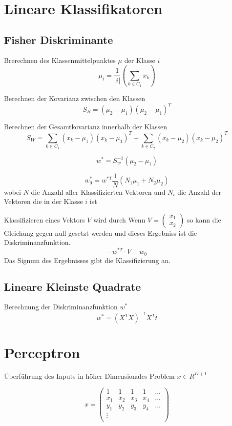 \documentclass{article}
\begin{document}
\section{Lineare Klassifikatoren}

\subsection{Fisher Diskriminante}

Brerechnen des Klassenmittelpunktes $\mu$ der Klasse $i$
$$\mu_i = \frac{1}{|i|} (\sum_{k \in C_1}^{} x_k)$$

Berechnen der Kovarianz zwischen den Klassen 
$$
S_{B} = (\mu_{2} - \mu_{1})(\mu_{2} - \mu_{1})^T
$$

Berechnen der Gesamtkovarianz innerhalb der Klassen
$$ S_{W} = \sum_{k \in C_1}^{}  (x_k - \mu_{1})(x_k - \mu_{1})^T +
\sum_{k \in C_2}^{}  (x_k - \mu_{2})(x_k - \mu_{2})^T
 $$
 


$$w^* = S_{w}^{-1}(\mu_{2} - \mu_{1}) $$

$$ w_{0}^* = w^{*T} \frac{1}{N} (N_{1} \mu_{1} + N_2 \mu_{2}) $$
wobei $N$ die Anzahl aller Klassifizierten Vektoren und $N_i$ die Anzahl der Vektoren die in der Klasse $i$ ist

Klassifizieren eines Vektors $V$ wird durch Wenn $V=\begin{pmatrix}
x_1 \\ x_2
\end{pmatrix}$ so kann die Gleichung gegen null gesetzt werden und dieses Ergebniss ist die Diskriminanzfunktion.
$$ - w^{*T} \cdot V - w_0 $$
Das Signum des Ergebnisses gibt die Klassifizierung an.

\subsection{Lineare Kleinste Quadrate}

Berechnung der Diskriminanzfunktion $w^*$
$$ w^* = (X^T X )^{-1}X^T t $$


\section{Perceptron}
Überführung des Inputs in höher Dimensionales Problem $x \in \!R^{D+1}$

$$x = \begin{pmatrix}
1 & 1 & 1 & 1 & ... \\
x_1 & x_2 & x_3 & x_4 & ...\\
y_1 & y_2 & y_3 & y_4 & ...\\
\vdots\\
\end{pmatrix}$$
\end{document}
